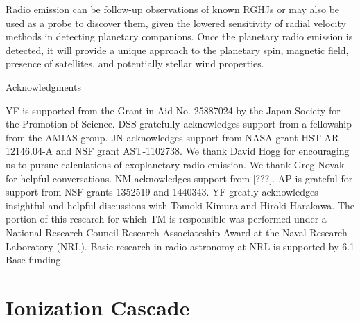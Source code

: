 \documentclass[iop,numberedappendix,apj]{emulateapj}
\begin{document}
Radio emission can be follow-up observations of known RGHJs or may also be used as a probe to discover them, given the lowered sensitivity of  radial velocity methods in detecting planetary companions. 
Once the planetary radio emission is detected, it will provide a unique approach to the planetary spin, magnetic field, presence of satellites, and potentially stellar wind properties. 


\vspace{0.5in}

\acknowledgements

{\sc Acknowledgments}

YF is supported from the Grant-in-Aid No. 25887024 by the Japan Society for the Promotion of Science.
DSS gratefully acknowledges support from a fellowship from the AMIAS group. JN acknowledges support from NASA grant HST AR-12146.04-A and NSF grant AST-1102738.
We thank David Hogg for encouraging us to pursue calculations of exoplanetary radio emission.
We thank Greg Novak for helpful conversations.
NM acknowledges support from [???]. 
AP is grateful for support from NSF grants 1352519 and 1440343.
YF greatly acknowledges insightful and helpful discussions with Tomoki Kimura and Hiroki Harakawa. 
The portion of this research for which TM is responsible was performed under a National Research 
Council Research Associateship Award at the Naval Research Laboratory (NRL).
Basic research in radio astronomy at NRL is supported by 6.1 Base funding.





\newpage

\appendix



\section{Ionization Cascade}
\label{sec:AppendixA}
\end{document}
